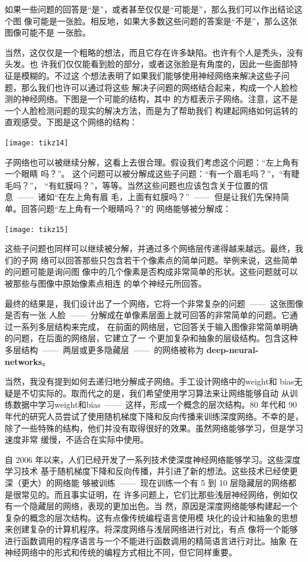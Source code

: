 如果一些问题的回答是“是”，或者甚至仅仅是“可能是”，那么我们可以作出结论这个图
像可能是一张脸。相反地，如果大多数这些问题的答案是“不是”，那么这张图像可能不是
一张脸。

当然，这仅仅是一个粗略的想法，而且它存在许多缺陷。也许有个人是秃头，没有头发。也
许我们仅仅能看到脸的部分，或者这张脸是有角度的，因此一些面部特征是模糊的。不过这
个想法表明了如果我们能够使用神经网络来解决这些子问题，那么我们也许可以通过将这些
解决子问题的网络结合起来，构成一个人脸检测的神经网络。下图是一个可能的结构，其中
的方框表示子网络。注意，这不是一个人脸检测问题的现实的解决方法，而是为了帮助我们
构建起网络如何运转的直观感受。下图是这个网络的结构：

\begin{center}
  \texttt{[image: tikz14]}
\end{center}

子网络也可以被继续分解，这看上去很合理。假设我们考虑这个问题：“左上角有一个眼睛
吗？”。 这个问题可以被分解成这些子问题：“有一个眉毛吗？”，“有睫毛吗？”，
“有虹膜吗？”，等等。当然这些问题也应该包含关于位置的信息~——~诸如“在左上角有眉
毛，上面有虹膜吗？”~——~但是让我们先保持简单。回答问题“左上角有一个眼睛吗？”的
网络能够被分解成：

\begin{center}
  \texttt{[image: tikz15]}
\end{center}

这些子问题也同样可以继续被分解，并通过多个网络层传递得越来越远。最终，我们的子网
络可以回答那些只包含若干个像素点的简单问题。举例来说，这些简单的问题可能是询问图
像中的几个像素是否构成非常简单的形状。这些问题就可以被那些与图像中原始像素点相连
的单个神经元所回答。

最终的结果是，我们设计出了一个网络，它将一个非常复杂的问题~——~这张图像是否有一张
人脸~——~分解成在单像素层面上就可回答的非常简单的问题。它通过一系列多层结构来完成，
在前面的网络层，它回答关于输入图像非常简单明确的问题，在后面的网络层，它建立了一
个更加复杂和抽象的层级结构。包含这种多层结构~——~两层或更多隐藏层~——~的网络被称为%
\textbf{\gls{deep-neural-networks}}。

当然，我没有提到如何去递归地分解成子网络。手工设计网络中的\gls*{weight}和%
\gls*{bias}无疑是不切实际的。取而代之的是，我们希望使用学习算法来让网络能够自动
从训练数据中学习\gls*{weight}和\gls*{bias}~——~这样，形成一个概念的层次结构。80
年代和 90年代的研究人员尝试了使用随机梯度下降和反向传播来训练深度网络。不幸的是，
除了一些特殊的结构，他们并没有取得很好的效果。虽然网络能够学习，但是学习速度非常
缓慢，不适合在实际中使用。

自 2006 年以来，人们已经开发了一系列技术使深度神经网络能够学习。这些深度学习技术
基于随机梯度下降和反向传播，并引进了新的想法。这些技术已经使更深（更大）的网络能
够被训练~——~现在训练一个有 5 到 10 层隐藏层的网络都是很常见的。而且事实证明，在
许多问题上，它们比那些浅层神经网络，例如仅有一个隐藏层的网络，表现的更加出色。当
然，原因是深度网络能够构建起一个复杂的概念的层次结构。这有点像传统编程语言使用模
块化的设计和抽象的思想来创建复杂的计算机程序。将深度网络与浅层网络进行对比，有点
像将一个能够进行函数调用的程序语言与一个不能进行函数调用的精简语言进行对比。抽象
在神经网络中的形式和传统的编程方式相比不同，但它同样重要。
